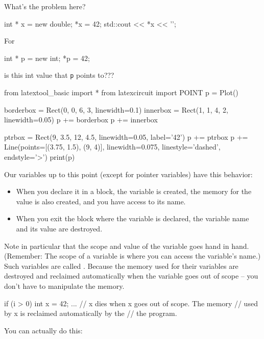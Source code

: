 \begin{ex}
What's the problem here?

\begin{consolethree}[escapeinside=||]
int * x = new double;
*x = 42;
std::cout << *x << '\n';
\end{consolethree}
\end{ex}

For

\begin{consolethree}[escapeinside=||]
int * p = new int;
*p = 42;
\end{consolethree}
\textit{} is this int value that \texttt{p} points to???
\begin{python}
from latextool_basic import *
from latexcircuit import POINT
p = Plot()

borderbox = Rect(0, 0, 6, 3, linewidth=0.1)
innerbox = Rect(1, 1, 4, 2, linewidth=0.05)
p += borderbox
p += innerbox

ptrbox = Rect(9, 3.5, 12, 4.5, linewidth=0.05, label='42')
p += ptrbox
p += Line(points=[(3.75, 1.5), (9, 4)], linewidth=0.075, linestyle='dashed', endstyle='>')
print(p)
\end{python}

\newpage{}

Our variables up to this point (except for pointer variables) have this
behavior:

\begin{itemize}

\item
  When you declare it in a block, the variable is created, the memory
  for the value is also created, and you have access to its name.
\item
  When you exit the block where the variable is declared, the variable
  name and its value are destroyed.
\end{itemize}

Note in particular that the scope and value of the variable goes hand in hand. (Remember: The scope of a variable is where you can access the variable's name.) Such variables are called . Because the memory used for their variables are destroyed and reclaimed automatically when the variable goes out of scope -- you don't have to manipulate the memory.

\begin{consolethree}[escapeinside=||]
if (i > 0)
{
    int x = 42;
    ...
}
// x dies when x goes out of scope. The memory
// used by x is reclaimed automatically by the
// the program.
\end{consolethree}
You can actually do this:

